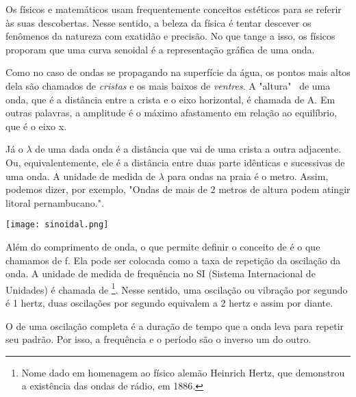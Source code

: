 \documentclass[book, 12pt, twoside, a5paper, english, brazil, sumario=tradicional, openany]{abntex2}
\begin{document}
\vspace{-0.3cm}

Os físicos e matemáticos usam frequentemente conceitos estéticos para se referir às suas descobertas. Nesse sentido, a beleza da física é tentar descever os fenômenos da natureza com exatidão e precisão. No que tange a isso, os físicos proporam que uma curva senoidal é a representação gráfica de uma onda.

Como no caso de ondas se propagando na superfície da água, os pontos mais altos dela são chamados de \textit{cristas} e os mais baixos de \textit{ventres}. A "altura" \ de uma onda, que é a distância entre a crista e o eixo horizontal, é chamada de {\color{celestialblue}{amplitude}} A. Em outras palavras, a amplitude é o máximo afastamento em relação ao equilíbrio, que é o eixo x\nocite{2}.

Já o {\color{celestialblue}{comprimento de onda}} $\lambda$ de uma dada onda é a distância que vai de uma crista a outra adjacente. Ou, equivalentemente, ele é a distância entre duas parte idênticas e sucessivas de uma onda. A unidade de medida de $\lambda$ para ondas na praia é o metro. Assim, podemos dizer, por exemplo, "Ondas de mais de 2 metros de altura podem atingir litoral pernambucano.".

\vspace{-0.5cm}
\begin{center}
    \texttt{[image: sinoidal.png]} 
\end{center}
\vspace{-1.2cm}

Além do comprimento de onda, o que permite definir o conceito de {\color{celestialblue}{rapidez da onda}} é o que chamamos de {\color{celestialblue}{frequência}} f. Ela pode ser colocada como a taxa de repetição da oscilação da onda. A unidade de medida de frequência no SI (Sistema Internacional de Unidades) é chamada de {\color{celestialblue}{hertz}}\footnote{Nome dado em homenagem ao físico alemão Heinrich Hertz, que demonstrou a existência das ondas de rádio, em 1886.}. Nesse sentido, uma oscilação ou vibração por segundo é 1 hertz, duas oscilações por segundo equivalem a 2 hertz e assim por diante.

O {\color{celestialblue}{período}} de uma oscilação completa é a duração de tempo que a onda leva para repetir seu padrão. Por isso, a frequência e o período são o inverso um do outro.

\vspace{-0.2cm}
\end{document}
